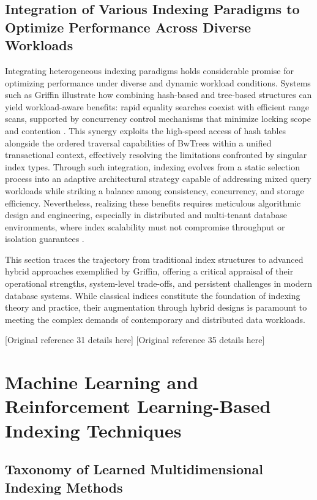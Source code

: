 \documentclass[sigconf]{acmart}
\begin{document}
\subsection{Integration of Various Indexing Paradigms to Optimize Performance Across Diverse Workloads}

Integrating heterogeneous indexing paradigms holds considerable promise for optimizing performance under diverse and dynamic workload conditions. Systems such as Griffin illustrate how combining hash-based and tree-based structures can yield workload-aware benefits: rapid equality searches coexist with efficient range scans, supported by concurrency control mechanisms that minimize locking scope and contention \cite{ref35}. This synergy exploits the high-speed access of hash tables alongside the ordered traversal capabilities of BwTrees within a unified transactional context, effectively resolving the limitations confronted by singular index types. Through such integration, indexing evolves from a static selection process into an adaptive architectural strategy capable of addressing mixed query workloads while striking a balance among consistency, concurrency, and storage efficiency. Nevertheless, realizing these benefits requires meticulous algorithmic design and engineering, especially in distributed and multi-tenant database environments, where index scalability must not compromise throughput or isolation guarantees \cite{ref31,ref35}.

This section traces the trajectory from traditional index structures to advanced hybrid approaches exemplified by Griffin, offering a critical appraisal of their operational strengths, system-level trade-offs, and persistent challenges in modern database systems. While classical indices constitute the foundation of indexing theory and practice, their augmentation through hybrid designs is paramount to meeting the complex demands of contemporary and distributed data workloads.

\begin{thebibliography}{99}
 [Original reference 31 details here]
 [Original reference 35 details here]
\end{thebibliography}

\section{Machine Learning and Reinforcement Learning-Based Indexing Techniques}

\subsection{Taxonomy of Learned Multidimensional Indexing Methods}
\end{document}
